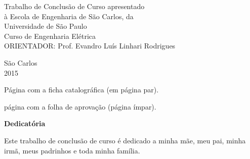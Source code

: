		\large
		{
			\begin{flushright}
			\Large{Trabalho de Conclusão de Curso apresentado} \hspace{1cm}\\
			\Large{à Escola de Engenharia de São Carlos, da}\\
			\Large{Universidade de São Paulo}\\
			\vspace{0.05\textheight}
			\Large{Curso de Engenharia Elétrica}\\
			\vspace{0.05\textheight}
			\Large{ORIENTADOR: Prof. Evandro Luís Linhari Rodrigues}\\
			\end{flushright}
	
			\begin{center}
				\vspace{0.15\textheight}
				\Large{São Carlos}\\
				\Large{2015}
			\end{center}
		}



\newpage

Página com a ficha catalográfica (em página par).

%

\newpage

página com a folha de aprovação (página ímpar). \cleardoublepage

\begin{comment}
\begin{figure}[H]
	\centering
	\texttt{[image: ./Resources/aprovacao.jpg]}
	\caption{Fluxo de comunicação entre os principais componentes.}
	\label{Aprovacao}
\end{figure}
\cleardoublepage
\end{comment}
\vspace{0.11\textheight} 
\begin{center}
\textbf{\Huge{Dedicatória}}
\end{center}
\vspace{0.05\textheight}	
		
Este trabalho de conclusão de curso é dedicado a minha mãe, meu pai, minha irmã, meus padrinhos e toda minha família.
		
